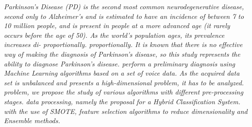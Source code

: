 \documentclass[12pt,a4paper,twoside]{report}
\begin{document}
\textit{Parkinson's Disease (PD) is the second most common neurodegenerative disease,
second only to Alzheimer's and is estimated to have an incidence of between
7 to 10 million people, and is present in people at a more advanced age
(it rarely occurs before the age of 50).
As the world's population ages, its prevalence increases di- proportionally.
proportionally. It is known that there is no effective way of making the
diagnosis of Parkinson's disease, so this study represents the ability to diagnose Parkinson's disease.
perform a preliminary diagnosis using Machine Learning algorithms based on a set of voice data.
As the acquired data set is unbalanced and presents a high-dimensional problem, it has to be analyzed.
problem, we propose the study of various algorithms with different pre-processing stages.
data processing, namely the proposal for a Hybrid Classification System.
with the use of SMOTE, feature selection algorithms to reduce dimensionality and Ensemble methods.}
\end{document}
